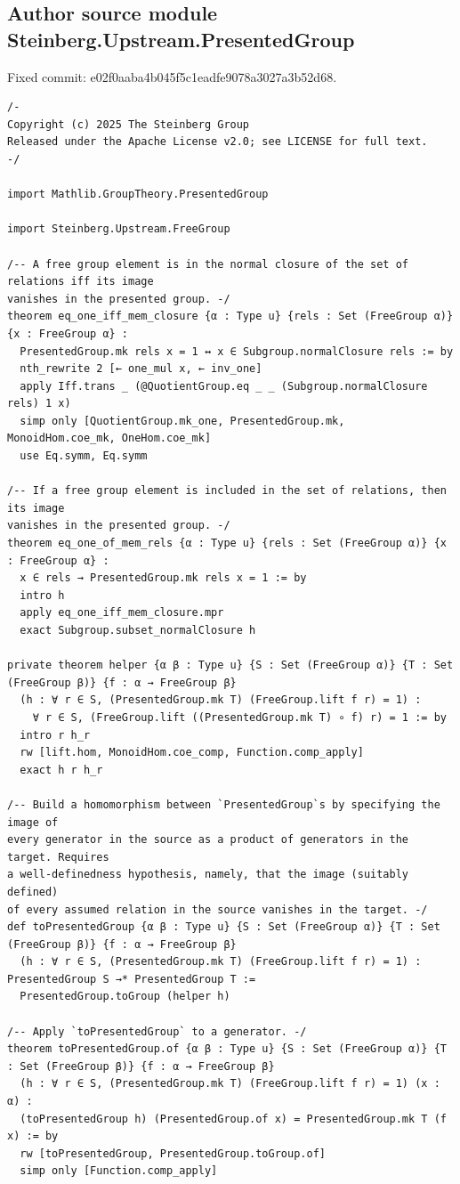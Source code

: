 \subsection*{Author source module Steinberg.Upstream.PresentedGroup}
\noindent Fixed commit: e02f0aaba4b045f5c1eadfe9078a3027a3b52d68.
\begin{Verbatim}
/-
Copyright (c) 2025 The Steinberg Group
Released under the Apache License v2.0; see LICENSE for full text.
-/

import Mathlib.GroupTheory.PresentedGroup

import Steinberg.Upstream.FreeGroup

/-- A free group element is in the normal closure of the set of relations iff its image
vanishes in the presented group. -/
theorem eq_one_iff_mem_closure {α : Type u} {rels : Set (FreeGroup α)} {x : FreeGroup α} :
  PresentedGroup.mk rels x = 1 ↔ x ∈ Subgroup.normalClosure rels := by
  nth_rewrite 2 [← one_mul x, ← inv_one]
  apply Iff.trans _ (@QuotientGroup.eq _ _ (Subgroup.normalClosure rels) 1 x)
  simp only [QuotientGroup.mk_one, PresentedGroup.mk, MonoidHom.coe_mk, OneHom.coe_mk]
  use Eq.symm, Eq.symm

/-- If a free group element is included in the set of relations, then its image
vanishes in the presented group. -/
theorem eq_one_of_mem_rels {α : Type u} {rels : Set (FreeGroup α)} {x : FreeGroup α} :
  x ∈ rels → PresentedGroup.mk rels x = 1 := by
  intro h
  apply eq_one_iff_mem_closure.mpr
  exact Subgroup.subset_normalClosure h

private theorem helper {α β : Type u} {S : Set (FreeGroup α)} {T : Set (FreeGroup β)} {f : α → FreeGroup β}
  (h : ∀ r ∈ S, (PresentedGroup.mk T) (FreeGroup.lift f r) = 1) :
    ∀ r ∈ S, (FreeGroup.lift ((PresentedGroup.mk T) ∘ f) r) = 1 := by
  intro r h_r
  rw [lift.hom, MonoidHom.coe_comp, Function.comp_apply]
  exact h r h_r

/-- Build a homomorphism between `PresentedGroup`s by specifying the image of
every generator in the source as a product of generators in the target. Requires
a well-definedness hypothesis, namely, that the image (suitably defined)
of every assumed relation in the source vanishes in the target. -/
def toPresentedGroup {α β : Type u} {S : Set (FreeGroup α)} {T : Set (FreeGroup β)} {f : α → FreeGroup β}
  (h : ∀ r ∈ S, (PresentedGroup.mk T) (FreeGroup.lift f r) = 1) : PresentedGroup S →* PresentedGroup T :=
  PresentedGroup.toGroup (helper h)

/-- Apply `toPresentedGroup` to a generator. -/
theorem toPresentedGroup.of {α β : Type u} {S : Set (FreeGroup α)} {T : Set (FreeGroup β)} {f : α → FreeGroup β}
  (h : ∀ r ∈ S, (PresentedGroup.mk T) (FreeGroup.lift f r) = 1) (x : α) :
  (toPresentedGroup h) (PresentedGroup.of x) = PresentedGroup.mk T (f x) := by
  rw [toPresentedGroup, PresentedGroup.toGroup.of]
  simp only [Function.comp_apply]


\end{Verbatim}
